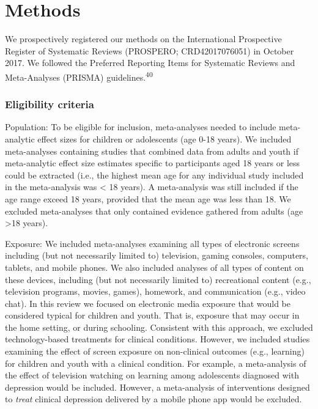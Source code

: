 \documentclass[
  english,
  man]{apa6}
\begin{document}
\hypertarget{methods}{%
\section{Methods}\label{methods}}

We prospectively registered our methods on the International Prospective Register of Systematic Reviews (PROSPERO; CRD42017076051) in October 2017.
We followed the Preferred Reporting Items for Systematic Reviews and Meta-Analyses (PRISMA) guidelines.\textsuperscript{40}

\hypertarget{eligibility-criteria}{%
\subsubsection{Eligibility criteria}\label{eligibility-criteria}}

Population:
To be eligible for inclusion, meta-analyses needed to include meta-analytic effect sizes for children or adolescents (age 0-18 years).
We included meta-analyses containing studies that combined data from adults and youth if meta-analytic effect size estimates specific to participants aged 18 years or less could be extracted (i.e., the highest mean age for any individual study included in the meta-analysis was \textless{} 18 years).
A meta-analysis was still included if the age range exceed 18 years, provided that the mean age was less than 18.
We excluded meta-analyses that only contained evidence gathered from adults (age \textgreater18 years).

Exposure:
We included meta-analyses examining all types of electronic screens including (but not necessarily limited to) television, gaming consoles, computers, tablets, and mobile phones.
We also included analyses of all types of content on these devices, including (but not necessarily limited to) recreational content (e.g., television programs, movies, games), homework, and communication (e.g., video chat).
In this review we focused on electronic media exposure that would be considered typical for children and youth.
That is, exposure that may occur in the home setting, or during schooling.
Consistent with this approach, we excluded technology-based treatments for clinical conditions.
However, we included studies examining the effect of screen exposure on non-clinical outcomes (e.g., learning) for children and youth with a clinical condition.
For example, a meta-analysis of the effect of television watching on learning among adolescents diagnosed with depression would be included.
However, a meta-analysis of interventions designed to \emph{treat} clinical depression delivered by a mobile phone app would be excluded.
\end{document}

